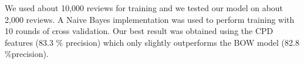 \documentclass[12pt,a4paper,oneside]{article}
\begin{document}
We used about 10,000 reviews for training and we tested our model on about 2,000 reviews. A Naive Bayes implementation was used to perform training with 10
rounds of cross validation. Our best result was obtained using the CPD features (83.3 \% precision) which only slightly outperforms the BOW model (82.8 \%precision). 
\end{document}
